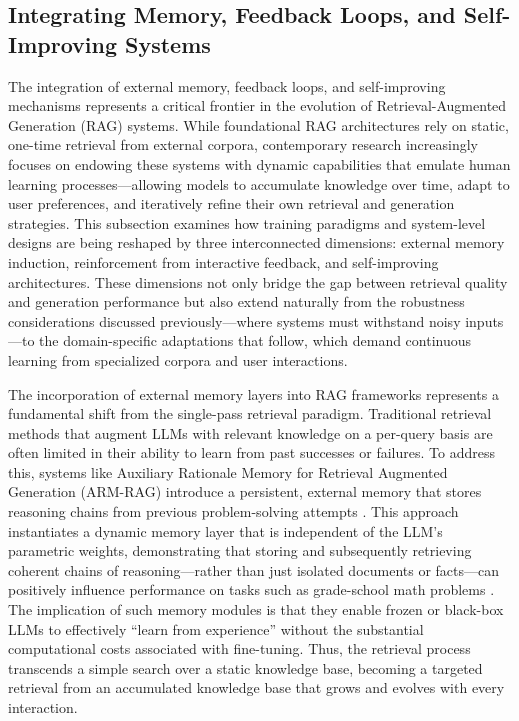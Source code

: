 \documentclass[11pt]{article}
\begin{document}
\subsection{Integrating Memory, Feedback Loops, and Self-Improving Systems}

The integration of external memory, feedback loops, and self-improving mechanisms represents a critical frontier in the evolution of Retrieval-Augmented Generation (RAG) systems. While foundational RAG architectures rely on static, one-time retrieval from external corpora, contemporary research increasingly focuses on endowing these systems with dynamic capabilities that emulate human learning processes---allowing models to accumulate knowledge over time, adapt to user preferences, and iteratively refine their own retrieval and generation strategies. This subsection examines how training paradigms and system-level designs are being reshaped by three interconnected dimensions: external memory induction, reinforcement from interactive feedback, and self-improving architectures. These dimensions not only bridge the gap between retrieval quality and generation performance but also extend naturally from the robustness considerations discussed previously---where systems must withstand noisy inputs---to the domain-specific adaptations that follow, which demand continuous learning from specialized corpora and user interactions.

The incorporation of external memory layers into RAG frameworks represents a fundamental shift from the single-pass retrieval paradigm. Traditional retrieval methods that augment LLMs with relevant knowledge on a per-query basis are often limited in their ability to learn from past successes or failures. To address this, systems like Auxiliary Rationale Memory for Retrieval Augmented Generation (ARM-RAG) introduce a persistent, external memory that stores reasoning chains from previous problem-solving attempts \cite{ref108}. This approach instantiates a dynamic memory layer that is independent of the LLM's parametric weights, demonstrating that storing and subsequently retrieving coherent chains of reasoning---rather than just isolated documents or facts---can positively influence performance on tasks such as grade-school math problems \cite{ref108}. The implication of such memory modules is that they enable frozen or black-box LLMs to effectively ``learn from experience'' without the substantial computational costs associated with fine-tuning. Thus, the retrieval process transcends a simple search over a static knowledge base, becoming a targeted retrieval from an accumulated knowledge base that grows and evolves with every interaction.
\end{document}
